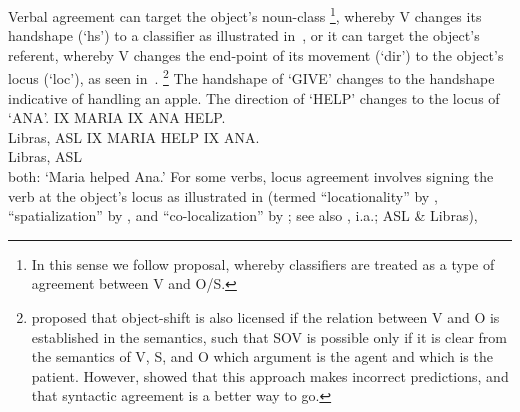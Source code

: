 \documentclass[output=paper]{langscibook}
\begin{document}
    \z 
\z
Verbal agreement can target the object's noun-class%
\footnote{%
    In this sense we follow  proposal, whereby
    classifiers are treated as a type of agreement between V and O/S.
}, 
whereby V
changes its handshape (`hs') to a classifier as illustrated in~, or it
can target the object's referent, whereby V changes the end-point of its
movement (`dir') to the object's locus (`loc'), as seen in~.%
\footnote{%
    \citet{Fischer.1975} proposed that object-shift is also licensed if the relation
    between V and O is established in the semantics, such that SOV is possible only if it
    is clear from the semantics of V, S, and O which argument is the agent and which is
    the patient. However, \citet{Liddell.1980} showed that this approach makes incorrect
    predictions, and that syntactic agreement is a better way to go.
}
\ea 
    \label{lasz:ex:3}
    The handshape of `GIVE' changes to the \laszClaw{} handshape indicative of handling an apple. 
    \z 
\ex
    \label{lasz:ex:4}
    The direction of `HELP' changes to the locus of `ANA'. 
    \ea 
        IX MARIA IX ANA HELP. \\
        \citep[from][6]{Quadros.etal.2004}
        \hfill 
        \cmark Libras, \cmark ASL 
    \ex 
        IX MARIA HELP IX ANA. \\
        \citep[from][5]{Quadros.etal.2004} 
        \hfill 
        \cmark Libras, \cmark ASL \\
        both: `Maria helped Ana.'
    \z 
\z 
For some verbs, locus agreement involves signing the verb at the
object's locus as illustrated in  (termed ``locationality'' by \citealp{Fischer.Gough.1978}, 
``spatialization'' by \citealp{Quadros.etal.2004}, 
and ``co-localization'' by \citealp{Lourenco.Wilbur.2018}; 
see also \citealp{Bergman.1980,Liddell.1980,Costello.2015,Smith.1990}, i.a.; ASL \& Libras),
\end{document}

